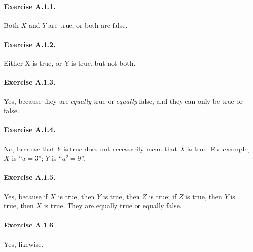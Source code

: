 \paragraph{Exercise A.1.1.} Both $X$ and $Y$ are true, or both are false.

\paragraph{Exercise A.1.2.} Either X is true, or Y is true, but not both.

\paragraph{Exercise A.1.3.} Yes, because they are \emph{equally} true or \emph{equally} false, and they can only be true or false.

\paragraph{Exercise A.1.4.} No, because that $Y$ is true does not necessarily mean that $X$ is true. For example, $X$ is ``$a=3$''; $Y$ is ``$a^2=9$''.

\paragraph{Exercise A.1.5.} Yes, because if $X$ is true, then $Y$ is true, then $Z$ is true; if $Z$ is true, then $Y$ is true, then $X$ is true. They are equally true or equally false.

\paragraph{Exercise A.1.6.} Yes, likewise.

